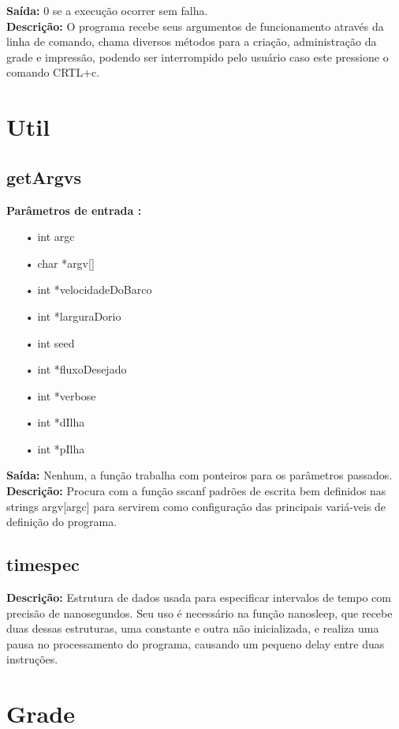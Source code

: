\documentclass[a4paper,11pt]{article}
\begin{document}
\textbf{Saída:} 0 se a execução ocorrer sem falha.\\

\textbf{Descrição:}
O programa recebe seus argumentos de funcionamento através da linha de comando, chama diversos métodos para a cria\c{c}ão, administra\c{c}ão da grade e impressão, podendo ser interrompido pelo usuário caso este pressione o comando CRTL+c.

\section{Util}
\subsection{getArgvs}
\textbf{Parâmetros de entrada :}
\begin{enumerate}
\item[•]{int argc}
\item[•]{char *argv[]}
\item[•]{int *velocidadeDoBarco}
\item[•]{int *larguraDorio}
\item[•]{int seed}
\item[•]{int *fluxoDesejado}
\item[•]{int *verbose}
\item[•]{int *dIlha}
\item[•]{int *pIlha}
\end{enumerate}
\textbf{Saída:} Nenhum, a fun\c{c}ão trabalha com ponteiros para os parâmetros passados.\\

\textbf{Descrição:}
Procura com a fun\c{c}ão sscanf padrões de escrita bem definidos nas strings argv[argc] para servirem como configura\c{c}ão das principais variá-veis de defini\c{c}ão do programa.

\subsection{timespec}
\textbf{Descrição:}
Estrutura de dados usada para especificar intervalos de tempo com precisão de nanosegundos. Seu uso é necessário na fun\c{c}ão nanosleep, que recebe duas dessas estruturas, uma constante e outra não inicializada, e realiza uma pausa no processamento do programa, causando um pequeno delay entre duas instru\c{c}ões.

\section{Grade}
\end{document}
